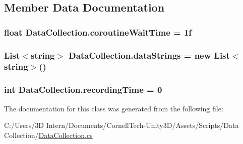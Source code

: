 \subsection{Member Data Documentation}
\subsubsection[{\texorpdfstring{coroutine\+Wait\+Time}{coroutineWaitTime}}]{\setlength{\rightskip}{0pt plus 5cm}float Data\+Collection.\+coroutine\+Wait\+Time = 1f}\hypertarget{class_data_collection_a18ef2fb2993192dfefdcad5b110493a2}{}\label{class_data_collection_a18ef2fb2993192dfefdcad5b110493a2}
\subsubsection[{\texorpdfstring{data\+Strings}{dataStrings}}]{\setlength{\rightskip}{0pt plus 5cm}List$<$string$>$ Data\+Collection.\+data\+Strings = new List$<$string$>$()}\hypertarget{class_data_collection_a239a38e434c21993aa890a51e284b5cc}{}\label{class_data_collection_a239a38e434c21993aa890a51e284b5cc}
\subsubsection[{\texorpdfstring{recording\+Time}{recordingTime}}]{\setlength{\rightskip}{0pt plus 5cm}int Data\+Collection.\+recording\+Time = 0}\hypertarget{class_data_collection_a8af35a5b2260dd692601c715f188f0e3}{}\label{class_data_collection_a8af35a5b2260dd692601c715f188f0e3}


The documentation for this class was generated from the following file\+:\begin{DoxyCompactItemize}
\item 
C\+:/\+Users/3\+D Intern/\+Documents/\+Cornell\+Tech-\/\+Unity3\+D/\+Assets/\+Scripts/\+Data Collection/\hyperlink{_data_collection_8cs}{Data\+Collection.\+cs}\end{DoxyCompactItemize}
